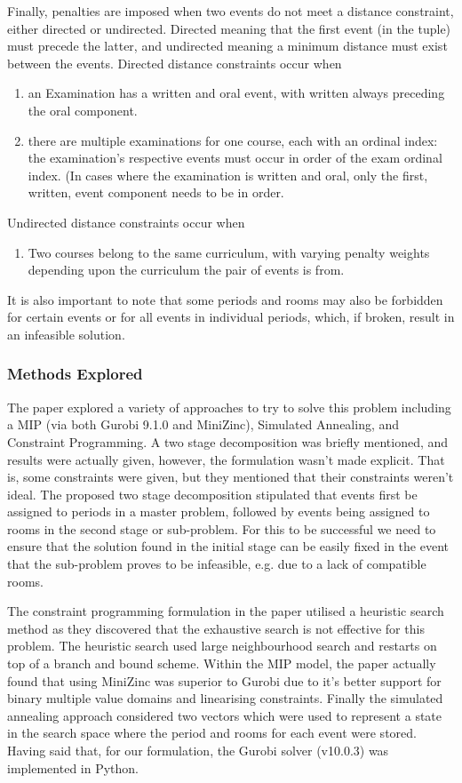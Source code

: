 \documentclass{article}
\begin{document}
Finally, penalties are imposed when two events do not meet a distance constraint, either directed or undirected. Directed meaning that the first event (in the tuple) must precede the latter, and undirected meaning a minimum distance must exist between the events. Directed distance constraints occur when
\begin{enumerate}
    \item an Examination has a written and oral event, with written always preceding the oral component.
    \item there are multiple examinations for one course, each with an ordinal index: the examination's respective events must occur in order of the exam ordinal index. (In cases where the examination is written and oral, only the first, written, event component needs to be in order.
\end{enumerate}

Undirected distance constraints occur when
\begin{enumerate}
    \item Two courses belong to the same curriculum, with varying penalty weights depending upon the curriculum the pair of events is from.
\end{enumerate}

It is also important to note that some periods and rooms may also be forbidden for certain events or for all events in individual periods, which, if broken, result in an infeasible solution.
\bigbreak

\subsubsection*{Methods Explored}
The paper explored a variety of approaches to try to solve this problem including a MIP (via both Gurobi 9.1.0 and MiniZinc), Simulated Annealing, and Constraint Programming. A two stage decomposition was briefly mentioned, and results were actually given, however, the formulation wasn't made explicit. That is, some constraints were given, but they mentioned that their constraints weren't ideal. The proposed two stage decomposition stipulated that events first be assigned to periods in a master problem, followed by events being assigned to rooms in the second stage or sub-problem. For this to be successful we need to ensure that the solution found in the initial stage can be easily fixed in the event that the sub-problem proves to be infeasible, e.g. due to a lack of compatible rooms. \medbreak

The constraint programming formulation in the paper utilised a heuristic search method as they discovered that the exhaustive search is not effective for this problem. The heuristic search used large neighbourhood search and restarts on top of a branch and bound scheme. Within the MIP model, the paper actually found that using MiniZinc was superior to Gurobi due to it's better support for binary multiple value domains and linearising constraints. Finally the simulated annealing approach considered two vectors which were used to represent a state in the search space where the period and rooms for each event were stored. Having said that, for our formulation, the Gurobi solver (v10.0.3) was implemented in Python.
\end{document}
